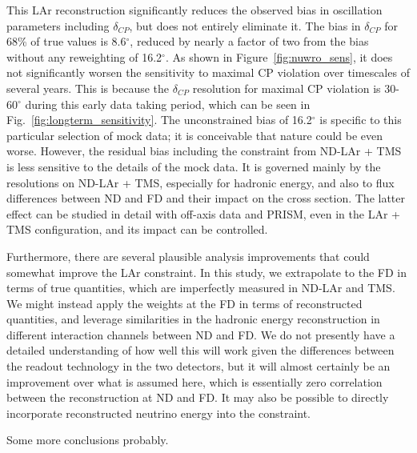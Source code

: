 \documentclass[11pt]{article}
\begin{document}
This LAr reconstruction significantly reduces the observed bias in oscillation parameters including $\delta_{CP}$, but does not entirely eliminate it. The bias in $\delta_{CP}$ for 68\% of true values is 8.6$^{\circ}$, reduced by nearly a factor of two from the bias without any reweighting of 16.2$^{\circ}$. As shown in Figure~\ref{fig:nuwro_sens}, it does not significantly worsen the sensitivity to maximal CP violation over timescales of several years. This is because the $\delta_{CP}$ resolution for maximal CP violation is 30-60$^{\circ}$ during this early data taking period, which can be seen in Fig.~\ref{fig:longterm_sensitivity}. The unconstrained bias of 16.2$^{\circ}$ is specific to this particular selection of mock data; it is conceivable that nature could be even worse. However, the residual bias including the constraint from ND-LAr + TMS is less sensitive to the details of the mock data. It is governed mainly by the resolutions on ND-LAr + TMS, especially for hadronic energy, and also to flux differences between ND and FD and their impact on the cross section. The latter effect can be studied in detail with off-axis data and PRISM, even in the LAr + TMS configuration, and its impact can be controlled.

Furthermore, there are several plausible analysis improvements that could somewhat improve the LAr constraint. In this study, we extrapolate to the FD in terms of true quantities, which are imperfectly measured in ND-LAr and TMS. We might instead apply the weights at the FD in terms of reconstructed quantities, and leverage similarities in the hadronic energy reconstruction in different interaction channels between ND and FD. We do not presently have a detailed understanding of how well this will work given the differences between the readout technology in the two detectors, but it will almost certainly be an improvement over what is assumed here, which is essentially zero correlation between the reconstruction at ND and FD. It may also be possible to directly incorporate reconstructed neutrino energy into the constraint.

Some more conclusions probably.
\end{document}
